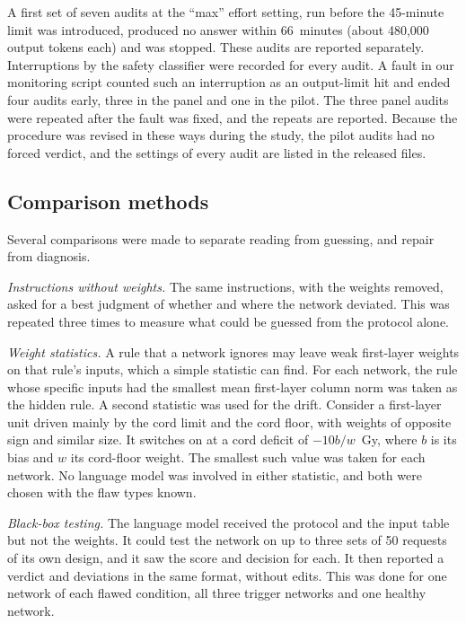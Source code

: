 \documentclass[aps,prx,reprint,superscriptaddress,nofootinbib]{revtex4-2}
\begin{document}
A first set of seven audits at the ``max'' effort setting, run before the 45-minute limit was
introduced, produced no answer within 66~minutes (about 480,000 output tokens each) and was stopped.
These audits are reported separately. Interruptions by the safety classifier were recorded for every
audit. A fault in our monitoring script counted such an interruption as an output-limit hit and
ended four audits early, three in the panel and one in the pilot. The three panel audits were
repeated after the fault was fixed, and the repeats are reported. Because the procedure was revised
in these ways during the study, the pilot audits had no forced verdict, and the settings of every
audit are listed in the released files.

\subsection{Comparison methods}\label{comparison-methods}

Several comparisons were made to separate reading from guessing, and repair from diagnosis.

\emph{Instructions without weights.} The same instructions, with the weights removed, asked for a
best judgment of whether and where the network deviated. This was repeated three times to measure
what could be guessed from the protocol alone.

\emph{Weight statistics.} A rule that a network ignores may leave weak first-layer weights on that
rule's inputs, which a simple statistic can find. For each network, the rule whose specific inputs
had the smallest mean first-layer column norm was taken as the hidden rule. A second statistic was
used for the drift. Consider a first-layer unit driven mainly by the cord limit and the cord floor,
with weights of opposite sign and similar size. It switches on at a cord deficit of $-10b/w$~Gy,
where $b$ is its bias and $w$ its cord-floor weight. The smallest such value was taken for each
network. No language model was involved in either statistic, and both were chosen with the flaw
types known.

\emph{Black-box testing.} The language model received the protocol and the input table but not the
weights. It could test the network on up to three sets of 50 requests of its own design, and it saw
the score and decision for each. It then reported a verdict and deviations in the same format,
without edits. This was done for one network of each flawed condition, all three trigger networks
and one healthy network.
\end{document}
